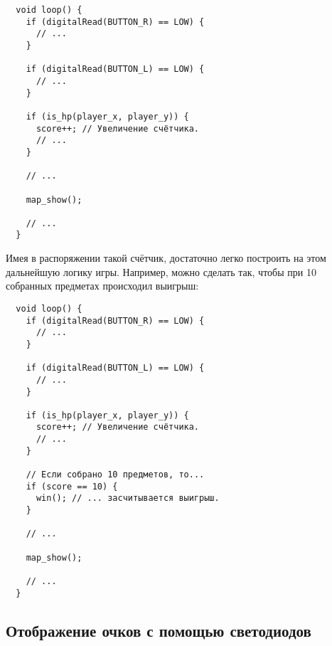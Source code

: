 \documentclass[../sparc.tex]{subfiles}
\begin{document}
\begin{verbatim}
  void loop() {
    if (digitalRead(BUTTON_R) == LOW) {
      // ...
    }

    if (digitalRead(BUTTON_L) == LOW) {
      // ...
    }

    if (is_hp(player_x, player_y)) {
      score++; // Увеличение счётчика.
      // ...
    }

    // ...

    map_show();

    // ...
  }
\end{verbatim}

Имея в распоряжении такой счётчик, достаточно легко построить на этом дальнейшую
логику игры.  Например, можно сделать так, чтобы при 10 собранных предметах
происходил выигрыш:

\begin{verbatim}
  void loop() {
    if (digitalRead(BUTTON_R) == LOW) {
      // ...
    }

    if (digitalRead(BUTTON_L) == LOW) {
      // ...
    }

    if (is_hp(player_x, player_y)) {
      score++; // Увеличение счётчика.
      // ...
    }

    // Если собрано 10 предметов, то...
    if (score == 10) {
      win(); // ... засчитывается выигрыш.
    }

    // ...

    map_show();

    // ...
  }
\end{verbatim}

\subsection{Отображение очков с помощью светодиодов}
\end{document}
